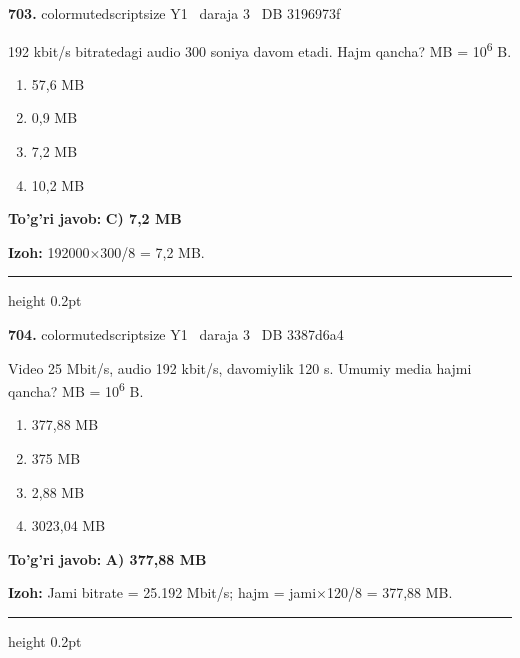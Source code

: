 \documentclass[10pt,a4paper,oneside]{article}
\begin{document}
\noindent\textbf{\color{ink}703.}  {color{muted}scriptsize Y1 \textbullet\ daraja 3 \textbullet\ DB 3196973f}
\par
192 kbit/s bitratedagi audio 300 soniya davom etadi. Hajm qancha? MB = 10\textsuperscript{6} B.
\begin{enumerate}[label=\Alph*),leftmargin=9mm]
\item 57,6 MB
\item 0,9 MB
\item 7,2 MB
\item 10,2 MB
\end{enumerate}
\begin{tcolorbox}[enhanced,breakable,colback=teal!4,colframe=teal!50!black,boxrule=0.5pt,arc=1.1mm,left=3mm,right=3mm,top=1.7mm,bottom=1.7mm,before skip=2mm,after skip=2mm]
\textbf{\color{teal}To'g'ri javob:} \textbf{C) 7,2 MB}
\par\smallskip
\textbf{Izoh:} 192000\ensuremath{\times}300/8 = 7,2 MB.
\end{tcolorbox}
\vspace{2mm}\hrule height 0.2pt \vspace{3mm}

\noindent\textbf{\color{ink}704.}  {color{muted}scriptsize Y1 \textbullet\ daraja 3 \textbullet\ DB 3387d6a4}
\par
Video 25 Mbit/s, audio 192 kbit/s, davomiylik 120 s. Umumiy media hajmi qancha? MB = 10\textsuperscript{6} B.
\begin{enumerate}[label=\Alph*),leftmargin=9mm]
\item 377,88 MB
\item 375 MB
\item 2,88 MB
\item 3023,04 MB
\end{enumerate}
\begin{tcolorbox}[enhanced,breakable,colback=teal!4,colframe=teal!50!black,boxrule=0.5pt,arc=1.1mm,left=3mm,right=3mm,top=1.7mm,bottom=1.7mm,before skip=2mm,after skip=2mm]
\textbf{\color{teal}To'g'ri javob:} \textbf{A) 377,88 MB}
\par\smallskip
\textbf{Izoh:} Jami bitrate = 25.192 Mbit/s; hajm = jami\ensuremath{\times}120/8 = 377,88 MB.
\end{tcolorbox}
\vspace{2mm}\hrule height 0.2pt \vspace{3mm}
\end{document}
